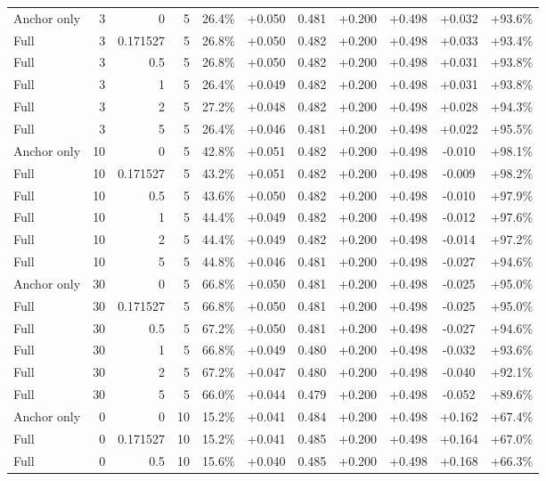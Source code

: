 \begin{table}[htbp]
\begin{tabular}{lrrrccccccc}
Anchor only & 3 & 0 & 5 & 26.4\% & +0.050 & 0.481 & +0.200 & +0.498 & +0.032 & +93.6\% \\
Full & 3 & 0.171527 & 5 & 26.8\% & +0.050 & 0.482 & +0.200 & +0.498 & +0.033 & +93.4\% \\
Full & 3 & 0.5 & 5 & 26.8\% & +0.050 & 0.482 & +0.200 & +0.498 & +0.031 & +93.8\% \\
Full & 3 & 1 & 5 & 26.4\% & +0.049 & 0.482 & +0.200 & +0.498 & +0.031 & +93.8\% \\
Full & 3 & 2 & 5 & 27.2\% & +0.048 & 0.482 & +0.200 & +0.498 & +0.028 & +94.3\% \\
Full & 3 & 5 & 5 & 26.4\% & +0.046 & 0.481 & +0.200 & +0.498 & +0.022 & +95.5\% \\
Anchor only & 10 & 0 & 5 & 42.8\% & +0.051 & 0.482 & +0.200 & +0.498 & -0.010 & +98.1\% \\
Full & 10 & 0.171527 & 5 & 43.2\% & +0.051 & 0.482 & +0.200 & +0.498 & -0.009 & +98.2\% \\
Full & 10 & 0.5 & 5 & 43.6\% & +0.050 & 0.482 & +0.200 & +0.498 & -0.010 & +97.9\% \\
Full & 10 & 1 & 5 & 44.4\% & +0.049 & 0.482 & +0.200 & +0.498 & -0.012 & +97.6\% \\
Full & 10 & 2 & 5 & 44.4\% & +0.049 & 0.482 & +0.200 & +0.498 & -0.014 & +97.2\% \\
Full & 10 & 5 & 5 & 44.8\% & +0.046 & 0.481 & +0.200 & +0.498 & -0.027 & +94.6\% \\
Anchor only & 30 & 0 & 5 & 66.8\% & +0.050 & 0.481 & +0.200 & +0.498 & -0.025 & +95.0\% \\
Full & 30 & 0.171527 & 5 & 66.8\% & +0.050 & 0.481 & +0.200 & +0.498 & -0.025 & +95.0\% \\
Full & 30 & 0.5 & 5 & 67.2\% & +0.050 & 0.481 & +0.200 & +0.498 & -0.027 & +94.6\% \\
Full & 30 & 1 & 5 & 66.8\% & +0.049 & 0.480 & +0.200 & +0.498 & -0.032 & +93.6\% \\
Full & 30 & 2 & 5 & 67.2\% & +0.047 & 0.480 & +0.200 & +0.498 & -0.040 & +92.1\% \\
Full & 30 & 5 & 5 & 66.0\% & +0.044 & 0.479 & +0.200 & +0.498 & -0.052 & +89.6\% \\
Anchor only & 0 & 0 & 10 & 15.2\% & +0.041 & 0.484 & +0.200 & +0.498 & +0.162 & +67.4\% \\
Full & 0 & 0.171527 & 10 & 15.2\% & +0.041 & 0.485 & +0.200 & +0.498 & +0.164 & +67.0\% \\
Full & 0 & 0.5 & 10 & 15.6\% & +0.040 & 0.485 & +0.200 & +0.498 & +0.168 & +66.3\% \\

\end{tabular}
\end{table}
